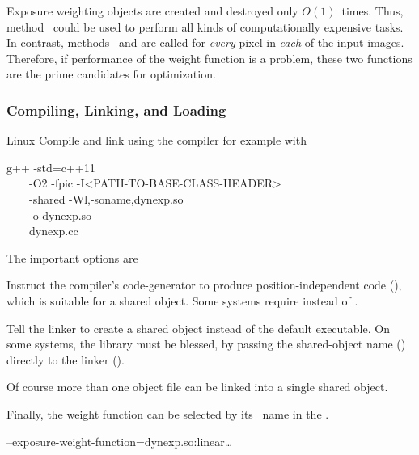 Exposure weighting objects are created and destroyed only $O(1)$~times.  Thus,
method~ could be used to perform all kinds of computationally expensive tasks.
In contrast, methods~ and  are called for \emph{every} pixel in
\emph{each} of the input images.  Therefore, if performance of the weight function is a problem,
these two functions are the prime candidates for optimization.


\subsubsection[Compiling, Linking, and Loading]{\label{sec:compiling-linking-loading}%
  Compiling, Linking, and Loading}

\begin{restrictedmaterial}{Linux}
  \noindent Compile and link using the  compiler for example with

  \begin{literal}
    g++ -std=c++11 \bslash \\
    ~~~~-O2 -fpic -I<PATH-TO-BASE-CLASS-HEADER> \bslash \\
    ~~~~-shared -Wl,-soname,dynexp.so \bslash \\
    ~~~~-o dynexp.so \bslash \\
    ~~~~dynexp.cc
  \end{literal}

  The important options are

  \begin{codelist}
  \item[\option{-fpic}]\itemend
    Instruct the compiler's code-generator to produce position\hyp{}independent code
    (), which is suitable for a shared object.  Some systems require 
    instead of .

  \item[\option{-shared}]\itemend
    Tell the linker to create a shared object instead of the default executable.  On some
    systems, the library must be blessed, by passing the shared-object name ()
    directly to the linker ().

    Of course more than one object file can be linked into a single shared object.
  \end{codelist}

  Finally, the weight function can be selected by its ~name in the
  .

  \begin{literal}
    \app{} --exposure-weight-function=dynexp.so:linear\dots
  \end{literal}
\end{restrictedmaterial}

